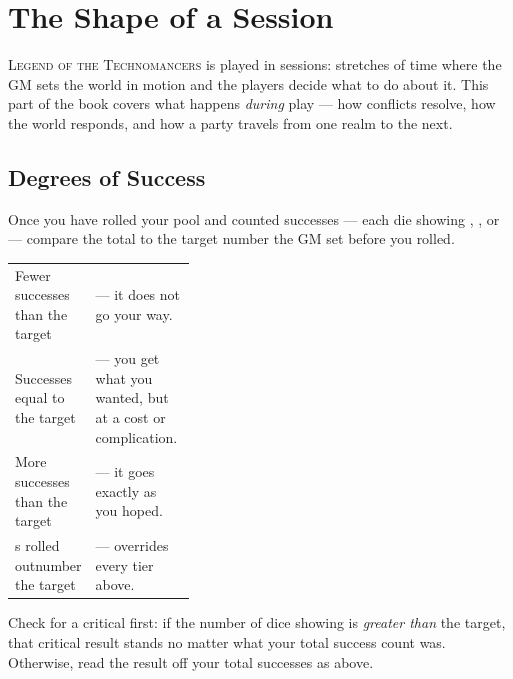 \chapter{The Shape of a Session}
\begin{readaloud}
\lipsum[25][1-3]
\end{readaloud}

\lettrine{L}{egend of the Technomancers} is played in sessions: stretches of time
where the GM sets the world in motion and the players decide what to do
about it. This part of the book covers what happens \emph{during} play ---
how conflicts resolve, how the world responds, and how a party travels
from one realm to the next.

\section{Degrees of Success}
Once you have rolled your pool and counted successes --- each die showing
, , or  --- compare the total to the target number
the GM set before you rolled.

\begin{statblock}
\begin{tabularx}{\linewidth}{@{}p{0.36\linewidth} Y@{}}
Fewer successes than the target &  --- it does not go your way.\\[3pt]
Successes equal to the target &  --- you get what you wanted, but at a cost or complication.\\[3pt]
More successes than the target &  --- it goes exactly as you hoped.\\[3pt]
s rolled outnumber the target &  --- overrides every tier above.\\
\end{tabularx}
\end{statblock}

Check for a critical first: if the number of dice showing  is
\emph{greater than} the target, that critical result stands no matter
what your total success count was. Otherwise, read the result off your
total successes as above.

